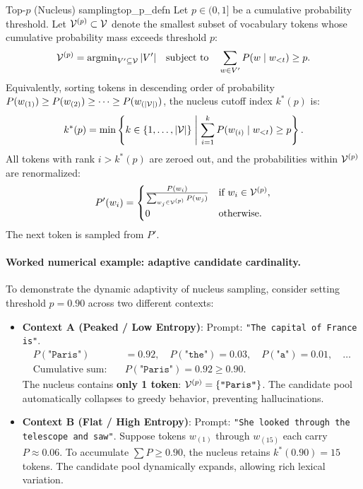 \documentclass[../../main.tex]{subfiles}
\begin{document}
\begin{definition}{Top-$p$ (Nucleus) sampling}{top_p_defn}
Let $p \in (0, 1]$ be a cumulative probability threshold. Let $\mathcal{V}^{(p)} \subset \mathcal{V}$ denote the smallest subset of vocabulary tokens whose cumulative probability mass exceeds threshold $p$:
\begin{equation}
\label{eq:nucleus_set_definition}
\mathcal{V}^{(p)} = \operatorname{argmin}_{V' \subseteq \mathcal{V}} |V'| \quad \text{subject to} \quad \sum_{w \in V'} P(w \mid w_{<t}) \ge p.
\end{equation}
Equivalently, sorting tokens in descending order of probability $P(w_{(1)}) \ge P(w_{(2)}) \ge \dots \ge P(w_{(|\mathcal{V}|)})$, the nucleus cutoff index $k^*(p)$ is:
\begin{equation}
\label{eq:nucleus_cutoff_index}
k^*(p) = \min \left\{ k \in \{1, \dots, |\mathcal{V}|\} \;\middle|\; \sum_{i=1}^k P(w_{(i)} \mid w_{<t}) \ge p \right\}.
\end{equation}
All tokens with rank $i > k^*(p)$ are zeroed out, and the probabilities within $\mathcal{V}^{(p)}$ are renormalized:
\begin{equation}
\label{eq:nucleus_renormalization}
P'(w_i) = \begin{cases}
\frac{P(w_i)}{\sum_{w_j \in \mathcal{V}^{(p)}} P(w_j)} & \text{if } w_i \in \mathcal{V}^{(p)}, \\
0 & \text{otherwise}.
\end{cases}
\end{equation}
The next token is sampled from $P'$.
\end{definition}

\paragraph{Worked numerical example: adaptive candidate cardinality.}
To demonstrate the dynamic adaptivity of nucleus sampling, consider setting threshold $p = 0.90$ across two different contexts:
\begin{itemize}
    \item \textbf{Context A (Peaked / Low Entropy)}: Prompt: \texttt{"The capital of France is"}.
    \begin{align*}
    P(\texttt{"Paris"}) &= 0.92, \quad P(\texttt{"the"}) = 0.03, \quad P(\texttt{"a"}) = 0.01, \quad \dots \\
    \text{Cumulative sum}: \quad & P(\texttt{"Paris"}) = 0.92 \ge 0.90.
    \end{align*}
    The nucleus contains \textbf{only 1 token}: $\mathcal{V}^{(p)} = \{\texttt{"Paris"}\}$. The candidate pool automatically collapses to greedy behavior, preventing hallucinations.
    \item \textbf{Context B (Flat / High Entropy)}: Prompt: \texttt{"She looked through the telescope and saw"}.
    Suppose tokens $w_{(1)}$ through $w_{(15)}$ each carry $P \approx 0.06$. To accumulate $\sum P \ge 0.90$, the nucleus retains $k^*(0.90) = 15$ tokens. The candidate pool dynamically expands, allowing rich lexical variation.
\end{itemize}
\end{document}
